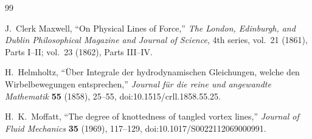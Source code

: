 \begin{thebibliography}{99}

J.~Clerk Maxwell,
``On Physical Lines of Force,''
\emph{The London, Edinburgh, and Dublin Philosophical Magazine and Journal of Science},
4th series, vol.~21 (1861), Parts I--II; vol.~23 (1862), Parts III--IV.

H.~Helmholtz,
``Über Integrale der hydrodynamischen Gleichungen, welche den Wirbelbewegungen entsprechen,''
\emph{Journal für die reine und angewandte Mathematik} \textbf{55} (1858), 25--55,
doi:10.1515/crll.1858.55.25.

H.~K.~Moffatt,
``The degree of knottedness of tangled vortex lines,''
\emph{Journal of Fluid Mechanics} \textbf{35} (1969), 117--129,
doi:10.1017/S0022112069000991.

\end{thebibliography}
